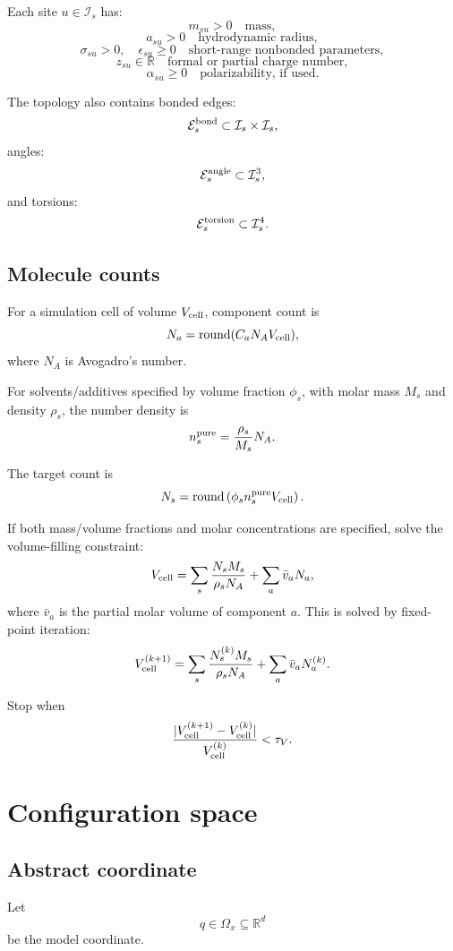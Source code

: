 \documentclass[11pt]{article}
\newcommand{\R}{\mathbb R}
\begin{document}
Each site \(u\in\mathcal I_s\) has:
\[
m_{su}>0
\quad
\text{mass},
\]
\[
a_{su}>0
\quad
\text{hydrodynamic radius},
\]
\[
\sigma_{su}>0,\quad \epsilon_{su}\ge0
\quad
\text{short-range nonbonded parameters},
\]
\[
z_{su}\in\mathbb R
\quad
\text{formal or partial charge number},
\]
\[
\alpha_{su}\ge0
\quad
\text{polarizability, if used}.
\]

The topology also contains bonded edges:
\[
\mathcal E_s^{\rm bond}
\subset
\mathcal I_s\times\mathcal I_s,
\]
angles:
\[
\mathcal E_s^{\rm angle}
\subset
\mathcal I_s^3,
\]
and torsions:
\[
\mathcal E_s^{\rm torsion}
\subset
\mathcal I_s^4.
\]

\subsection{Molecule counts}

For a simulation cell of volume \(V_{\rm cell}\), component count is
\[
N_a=\operatorname{round}(C_aN_A V_{\rm cell}),
\]
where \(N_A\) is Avogadro's number.

For solvents/additives specified by volume fraction \(\phi_s\), with molar mass
\(M_s\) and density \(\rho_s\), the number density is
\[
n_s^{\rm pure}
=
\frac{\rho_s}{M_s}N_A.
\]

The target count is
\[
N_s
=
\operatorname{round}\left(
\phi_s n_s^{\rm pure} V_{\rm cell}
\right).
\]

If both mass/volume fractions and molar concentrations are specified, solve the
volume-filling constraint:
\[
V_{\rm cell}
=
\sum_s \frac{N_sM_s}{\rho_sN_A}
+
\sum_a \bar v_a N_a,
\]
where \(\bar v_a\) is the partial molar volume of component \(a\). This is solved
by fixed-point iteration:
\[
V_{\rm cell}^{(k+1)}
=
\sum_s \frac{N_s^{(k)}M_s}{\rho_sN_A}
+
\sum_a \bar v_a N_a^{(k)}.
\]

Stop when
\[
\frac{|V_{\rm cell}^{(k+1)}-V_{\rm cell}^{(k)}|}
{V_{\rm cell}^{(k)}}<\tau_V.
\]

\section{Configuration space}
\label{sec:configspace}

\subsection{Abstract coordinate}

Let
\[
q\in\Omega_x\subseteq\R^d
\]
be the model coordinate.
\end{document}
